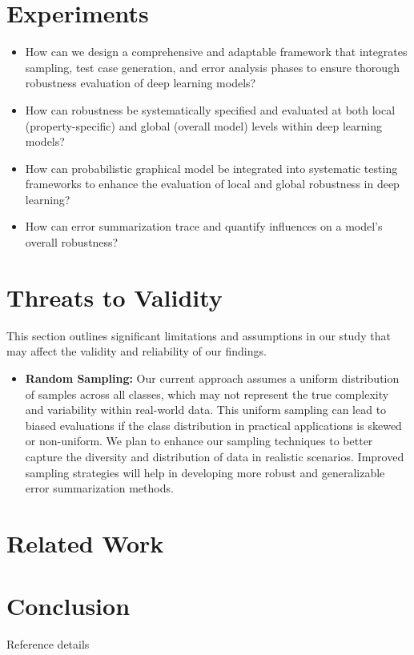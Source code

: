 \documentclass[10pt, conference, a4paper, final]{IEEEtran}
\begin{document}
\section{Experiments}
\begin{itemize}
    \item How can we design a comprehensive and adaptable framework that integrates sampling, test case generation, and error analysis phases to ensure thorough robustness evaluation of deep learning models?
    \item How can robustness be systematically specified and evaluated at both local (property-specific) and global (overall model) levels within deep learning models?
    \item How can probabilistic graphical model be integrated into systematic testing frameworks to enhance the evaluation of local and global robustness in deep learning?
    \item  How can error summarization trace and quantify influences on a model’s overall robustness?
 
\end{itemize}

\section{Threats to Validity}

This section outlines significant limitations and assumptions in our study that may affect the validity and reliability of our findings.

\begin{itemize}
    \item \textbf{Random Sampling:} Our current approach assumes a uniform distribution of samples across all classes, which may not represent the true complexity and variability within real-world data. This uniform sampling can lead to biased evaluations if the class distribution in practical applications is skewed or non-uniform. We plan to enhance our sampling techniques to better capture the diversity and distribution of data in realistic scenarios. Improved sampling strategies will help in developing more robust and generalizable error summarization methods.
\end{itemize}


\section{Related Work}

\section{Conclusion}

\begin{thebibliography}{01}
     Reference details
\end{thebibliography}
\end{document}
